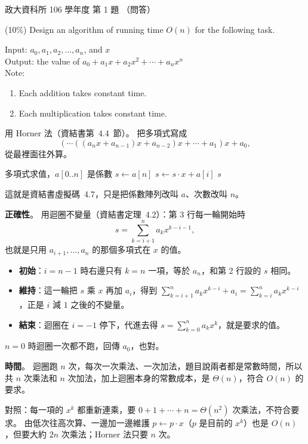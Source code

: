 \begin{pastexam}[label={px:nccu-106-dsa-01}]{政大資科所 106 學年度 第 1 題}
（問答）

(10\%) Design an algorithm of running time $O(n)$ for the following task.

\hspace*{1.5em}Input: $a_0,a_1,a_2,\ldots,a_n$, and $x$\\
\hspace*{1.5em}Output: the value of $a_0+a_1x+a_2x^2+\cdots+a_nx^n$\\
\hspace*{1.5em}Note:
\begin{enumerate}[label=\Alph*.,leftmargin=4em]
\item Each addition takes constant time.
\item Each multiplication takes constant time.
\end{enumerate}
\end{pastexam}

\begin{pastsoln}
用 Horner 法（資結書第~4.4~節）。 把多項式寫成
\[
(\cdots((a_n x + a_{n-1})x + a_{n-2})x + \cdots + a_1)x + a_0,
\]
從最裡面往外算。
\begin{pseudo}[unbreakable]{多項式求值，$a[0..n]$ 是係數}
    \State $s \gets a[n]$
        \State $s \gets s \cdot x + a[i]$
    \EndFor
    \State \Return $s$
\EndFunction
\end{pseudo}
這就是資結書虛擬碼~4.7，只是把係數陣列改叫 $a$、次數改叫 $n$。

\textbf{正確性}。 用迴圈不變量（資結書定理~4.2）：第 3 行每一輪開始時
\[
s = \sum_{k=i+1}^{n} a_k x^{k-i-1},
\]
也就是只用 $a_{i+1}, \ldots, a_n$ 的那個多項式在 $x$ 的值。
\begin{itemize}
\item \textbf{初始}：$i = n - 1$ 時右邊只有 $k = n$ 一項，等於 $a_n$，和第 2 行設的 $s$ 相同。
\item \textbf{維持}：這一輪把 $s$ 乘 $x$ 再加 $a_i$，得到
$\sum_{k=i+1}^{n} a_k x^{k-i} + a_i = \sum_{k=i}^{n} a_k x^{k-i}$，正是 $i$ 減 $1$ 之後的不變量。
\item \textbf{結束}：迴圈在 $i = -1$ 停下，代進去得 $s = \sum_{k=0}^{n} a_k x^{k}$，就是要求的值。
\end{itemize}
$n = 0$ 時迴圈一次都不跑，回傳 $a_0$，也對。

\textbf{時間}。 迴圈跑 $n$ 次，每次一次乘法、一次加法，題目說兩者都是常數時間，所以共
$n$ 次乘法和 $n$ 次加法，加上迴圈本身的常數成本，是 $\Theta(n)$，符合 $O(n)$ 的要求。

對照：每一項的 $x^k$ 都重新連乘，要 $0 + 1 + \cdots + n = \Theta(n^2)$ 次乘法，不符合要求。
由低次往高次算、一邊加一邊維護 $p \gets p \cdot x$（$p$ 是目前的 $x^k$）也是 $O(n)$，但要大約
$2n$ 次乘法；Horner 法只要 $n$ 次。
\end{pastsoln}
